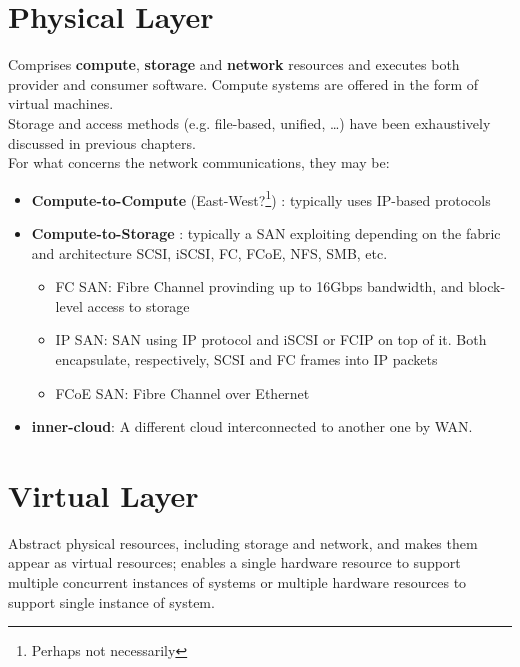 \section{Physical Layer}
Comprises \textbf{compute}, \textbf{storage} and \textbf{network} resources and executes both provider and consumer software. Compute systems are offered in the form of virtual machines.\\
Storage and access methods (e.g. file-based, unified, \dots) have been exhaustively discussed in previous chapters.\\
For what concerns the network communications, they may be:\ns
\begin{itemize}
   \item \textbf{Compute-to-Compute} (East-West?\footnote{Perhaps not necessarily}) : typically uses IP-based protocols
   \item \textbf{Compute-to-Storage} : typically a SAN exploiting depending on the fabric and architecture SCSI, iSCSI, FC, FCoE, NFS, SMB, etc.
   \ns
   \begin{itemize}
      \item FC SAN: Fibre Channel provinding up to 16Gbps bandwidth, and block-level access to storage
      \item IP SAN: SAN using IP protocol and iSCSI or FCIP on top of it. Both encapsulate, respectively, SCSI and FC frames into IP packets
      \item FCoE SAN: Fibre Channel over Ethernet
   \end{itemize}
   \item \textbf{inner-cloud}: A different cloud interconnected to another one by WAN.
\end{itemize}

\section{Virtual Layer}
Abstract physical resources, including storage and network, and makes them appear as virtual resources;
enables a single hardware resource to support multiple concurrent instances of systems or multiple hardware resources to support single instance of system.
\nl

\nl

